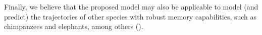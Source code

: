 \documentclass[preprint,12pt,authoryear]{elsarticle}
\begin{document}
Finally, we believe that the proposed model may also be applicable to model (and predict) the trajectories of other species with robust memory capabilities, such as  chimpanzees and  elephants, among others (\cite{Janmaat2013,Polansky2015}).








\end{document}
